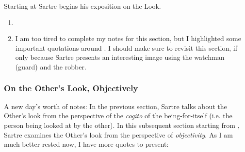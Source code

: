 \noindent
Starting at \autocite[354]{sartre} Sartre begins his exposition on the Look.

\begin{enumerate}
  \item {}
  \item I am too tired to complete my notes for this section, but I highlighted some important quotations around \autocite[362 -- 366]{sartre}. I should make sure to revisit this section, if only because Sartre presents an interesting image using the watchman (guard) and the robber.
\end{enumerate}

\subsubsection{On the Other's Look, Objectively}

\noindent
A new day's worth of notes: In the previous section, Sartre talks about the Other's look from the perspective of the \emph{cogito} of the being-for-itself (i.e. the person being looked at by the other). In this subsequent section starting from \autocite[368 -- 375]{sartre}, Sartre examines the Other's look from the perspective of \emph{objectivity}. As I am much better rested now, I have more quotes to present:

